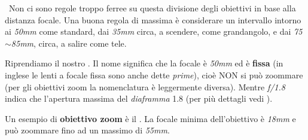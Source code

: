 \nb~Non ci sono regole troppo ferree su questa divisione degli obiettivi in base alla distanza focale.
Una buona regola di massima è considerare un intervallo intorno ai \textit{50mm} come standard, dai \textit{35mm} circa, a scendere, come grandangolo, e dai \textit{75$\sim$85mm}, circa, a salire come tele.


Riprendiamo il nostro .\newline
Il nome significa che la focale è \textit{50mm} ed è \textbf{fissa} (in inglese le lenti a focale fissa sono anche dette \textit{prime}), cioè NON si può zoommare (per gli obiettivi zoom la nomenclatura è leggermente diversa).
Mentre \textit{f/1.8} indica che l'apertura massima del \textit{diaframma} 1.8 (per più dettagli vedi ).

Un esempio di \textbf{obiettivo zoom} è il .\newline
La focale minima dell'obiettivo è \textit{18mm} e può zoommare fino ad un massimo di \textit{55mm}.